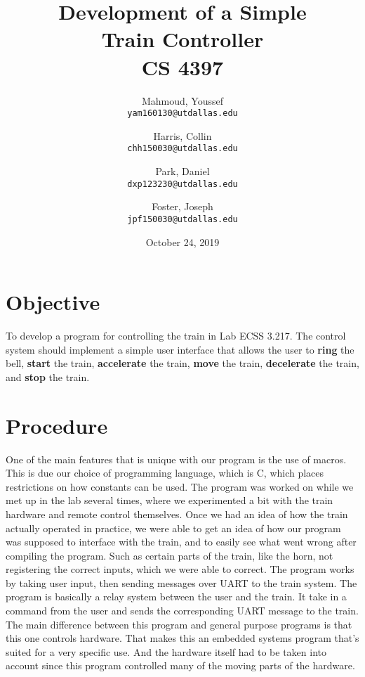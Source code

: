 \documentclass{article}
\author{
	Mahmoud, Youssef\\
	\texttt{yam160130@utdallas.edu}
	\and
	Harris, Collin\\
	\texttt{chh150030@utdallas.edu}
	\and
	Park, Daniel\\
	\texttt{dxp123230@utdallas.edu}
	\and
	Foster, Joseph\\
	\texttt{jpf150030@utdallas.edu}
}
\date{October 24, 2019}
\title{
  \textbf{
    Development of a Simple \\ Train Controller \\ CS 4397
  }
}
\begin{document}
  \maketitle

  \section{Objective}
    To develop a program for controlling the train in Lab ECSS 3.217. The control system
		should implement a simple user interface that allows the user to \textbf{ring} the
		bell, \textbf{start} the train, \textbf{accelerate} the train, \textbf{move} the
		train, \textbf{decelerate} the train, and \textbf{stop} the train.

  \section{Procedure}
	  One of the main features that is unique with our program is the use of macros. This is due our choice of programming language,
	  which is C, which places restrictions on how constants can be used. The program was worked on while we met up in the lab
	  several times, where we experimented a bit with the train hardware and remote control themselves. Once we had an idea of how
	  the train actually operated in practice, we were able to get an idea of how our program was supposed to interface with the 
	  train, and to easily see what went wrong after compiling the program. Such as certain parts of the train, like the horn, not
	  registering the correct inputs, which we were able to correct. The program works by taking user input, then sending
	  messages over UART to the train system. The program is basically a relay system between the user and the train. It take in a
	  command from the user and sends the corresponding UART message to the train. The main difference between this program and
	  general purpose programs is that this one controls hardware. That makes this an embedded systems program that's suited for a
	  very specific use. And the hardware itself had to be taken into account since this program controlled many of the moving parts
	  of the hardware.
\end{document}
